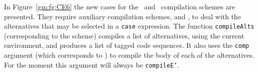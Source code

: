 In Figure~\ref{gm:fg:CE6} the new cases for the \tE{}~and~\tC{}
compilation schemes are presented.  They require auxiliary compilation
schemes, \tD{} and \tA{}, to deal with the alternatives that may be
selected in a \mbox{\tt case} expression. The function \mbox{\tt compileAlts}
(corresponding to the \tD{} scheme) compiles a list of alternatives,
using the current environment, and produces a list of tagged code
sequences. It also uses the \mbox{\tt comp} argument (which corresponds to
\tA{}) to compile the body of each of the alternatives. For the moment
this argument will always be \mbox{\tt compileE'}.
